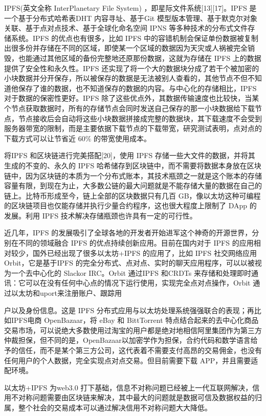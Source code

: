 \documentclass[
  10
]{article}
\begin{document}
IPFS(英文全称 InterPlanetary File System)
，即星际文件系统{[}13{]}{[}17{]}。IPFS 是一个基于分布式哈希表DHT
内容寻址、基于Git
模型版本管理、基于默克尔对象关联、基于点对点技术、基于全球化命名空间
IPNS 等多种技术的分布式文件存储系统。IPFS 的优点也有很多，比如 IPFS
中的容错机制会保证单份数据被复制出很多份并存储在不同的区域，即使某一个区域的数据因为天灾或人祸被完全销毁，也能通过其他区域的备份完整地还原那份数据，这就为存储在
IPFS 上的数据提供了安全性和永久性。IPFS
还实现了将一个大的数据块分成了若干个被加密的小块数据并分开保存，所以被保存的数据是无法被别人查看的，其他节点不但不知道他保存了谁的数据，也不知道保存的数据的内容。与中心化的存储相比，IPFS
对于数据的保密性更好。IPFS
除了这些优点外，其数据传输速度也比较快，当某个节点获取数据时，所有的存储节点会同时发送自己保存的那一小块数据给下载节点，节点接收后会自动将这些小块数据拼接成完整的数据块，其下载速度不会受到服务器带宽的限制，而是主要依据下载节点的下载带宽，研究测试表明，点对点的下载方式可以让节省近
\(60 \%\) 的带宽使用成本。

将IPFS 和区块链进行完美搭配{[}20{]}，使用 IPFS
存储一些大文件的数据，并将其生成的不变的、永久的 IPFS
哈希储存到区块链中，而不需要将数据本身放在区块链中，因为区块链的本质为一个分布式账本，其技术瓶颈之一就是这个账本的存储容量有限，到现在为止，大多数公链的最大问题就是不能存储大量的数据在自己的链上。比特币形成至今，链上全部的区块数据只有几百
GB，像以太坊这种可编程的区块链项目也仅能存储并执行少量合约程序，这也很大程度上限制了
DApp 的发展。利用 IPFS 技术解决存储瓶颈也许具有一定的可行性。

近几年，IPFS
的发展吸引了全球各地的开发者开始进军这个神奇的开源世界，分别在不同的领域融合
IPFS 的优点持续创新应用。目前在国内对于 IPFS
的应用相对较少，国外已经出现了很多以太坊+IPFS 的应用了，比如 IPFS
社交网络应用 Orbit，它是基于IPFS
的完全分布式、点对点、实时的聊天应用程序，可以以被视为一个去中心化的
Slackor IRC。Orbit 通过IPFS 和CRDTs
来存储和处理即时通讯：它可以在没有任何中心点的情况下运行使用，实现完全点对点操作，Orbit
通过以太坊和uport来注册账户、跟踪用

户以及身份信息。这是 IPFS
分布式应用与以太坊处理系统强强联合的表现；再比如IPFS电商 OpenBazaar，将
eBay 和 BittTorrent
特点结合起来的去中心化商品交易市场，可以说绝大多数使用过淘宝的用户都是绝对地相信阿里集团作为第三方仲裁担保，但不同的是，OpenBazaar以加密学作为担保，合约代码和数学语言给予的信任，而不是某个第三方公司，这代表着不需要支付高昂的交易佣金，也没有任何用户的个人数据，完全实现点对点交易。但目前需要下载
APP，并且需要适配环境。

以太坊+IPFS 为web3.0
打下基础，信息不对称问题已经被上一代互联网解决，信用不对称问题需要由区块链来解决，其中最大的问题就是数据可信及数据权益的归属，整个社会的交易成本可以通过解决信用不对称问题大大降低。
\end{document}
